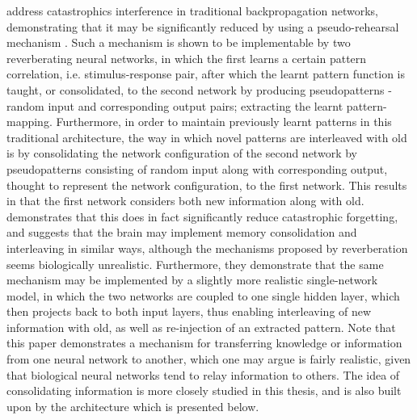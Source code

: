 \cite{Ans1997} address catastrophics interference in traditional backpropagation networks, demonstrating that it may be significantly reduced by using a pseudo-rehearsal mechanism \citep{Robins1995, Robins1996}. Such a mechanism is shown to be implementable by two reverberating neural networks, in which the first learns a certain pattern correlation, i.e. stimulus-response pair, after which the learnt pattern function is taught, or consolidated, to the second network by producing pseudopatterns - random input and corresponding output pairs; extracting the learnt pattern-mapping. Furthermore, in order to maintain previously learnt patterns in this traditional architecture, the way in which novel patterns are interleaved with old is by consolidating the network configuration of the second network by pseudopatterns consisting of random input along with corresponding output, thought to represent the network configuration, to the first network. This results in that the first network considers both new information along with old. \cite{Ans1997} demonstrates that this does in fact significantly reduce catastrophic forgetting, and suggests that the brain may implement memory consolidation and interleaving in similar ways, although the mechanisms proposed by reverberation seems biologically unrealistic. Furthermore, they demonstrate that the same mechanism may be implemented by a slightly more realistic single-network model, in which the two networks are coupled to one single hidden layer, which then projects back to both input layers, thus enabling interleaving of new information with old, as well as re-injection of an extracted pattern. Note that this paper demonstrates a mechanism for transferring knowledge or information from one neural network to another, which one may argue is fairly realistic, given that biological neural networks tend to relay information to others. The idea of consolidating information is more closely studied in this thesis, and is also built upon by the architecture which is presented below.

